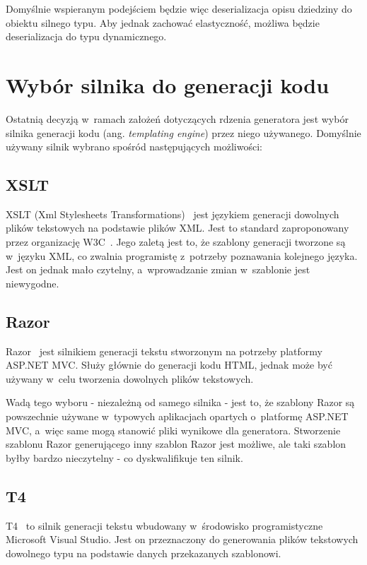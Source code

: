 Domyślnie wspieranym podejściem będzie więc deserializacja opisu dziedziny do obiektu silnego typu.
Aby jednak zachować elastyczność, możliwa będzie deserializacja do typu dynamicznego.



\section{Wybór silnika do generacji kodu} \label{sec:core:templating_engine}

Ostatnią decyzją w~ramach założeń dotyczących rdzenia generatora jest wybór silnika generacji kodu (ang. \emph{templating engine}) przez niego używanego.
Domyślnie używany silnik wybrano spośród następujących możliwości:


\subsection{XSLT}

XSLT (Xml Stylesheets Transformations)~\cite{xslt} jest językiem generacji dowolnych plików tekstowych na podstawie plików XML.
Jest to standard zaproponowany przez organizację W3C~\cite{w3c}.
Jego zaletą jest to, że szablony generacji tworzone są w~języku XML, co zwalnia programistę z~potrzeby poznawania kolejnego języka.
Jest on jednak mało czytelny, a~wprowadzanie zmian w~szablonie jest niewygodne.


\subsection{Razor}

Razor~\cite{razor} jest silnikiem generacji tekstu stworzonym na potrzeby platformy ASP.NET MVC.
Służy głównie do generacji kodu HTML, jednak może być używany w~celu tworzenia dowolnych plików tekstowych.

Wadą tego wyboru - niezależną od samego silnika - jest to, że szablony Razor są powszechnie używane w~typowych aplikacjach opartych o~platformę ASP.NET MVC, a~więc same mogą stanowić pliki wynikowe dla generatora.
Stworzenie szablonu Razor generującego inny szablon Razor jest możliwe, ale taki szablon byłby bardzo nieczytelny - co dyskwalifikuje ten silnik.


\subsection{T4}

T4~\cite{t4} to silnik generacji tekstu wbudowany w~środowisko programistyczne Microsoft Visual Studio.
Jest on przeznaczony do generowania plików tekstowych dowolnego typu na podstawie danych przekazanych szablonowi.

